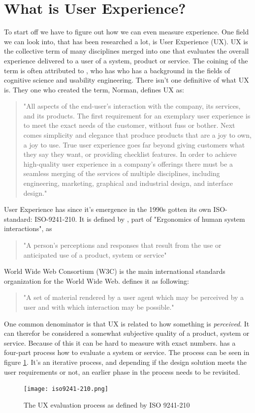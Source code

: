 \documentclass{cslthse-msc}
\begin{document}
    \section{What is User Experience?}
    To start off we have to figure out how we can even measure experience. One field we can look into, that has been researched a lot, is User Experience (UX). UX is the collective term of many disciplines merged into one that evaluates the overall experience delivered to a user of a
    system, product or service. The coining of the term is often attributed to \citet{norman}, who has who has a background in the fields of cognitive science and usability engineering. There isn't one definitive of what UX is. They one who created the term, Norman, defines UX as:
    \begin{quote}
        "All aspects of the end-user’s interaction with the company, its services, and its products. The first requirement for an exemplary user experience is to meet the exact needs of the customer, without fuss or bother. Next comes simplicity and elegance that produce products that are a joy to own, a joy to use. True user experience goes far beyond giving customers what they say they want, or providing checklist features. In order to achieve high-quality user experience in a company’s offerings there must be a seamless merging of the services of multiple disciplines, including engineering, marketing, graphical and industrial design, and interface design."
    \end{quote}
    User Experience has since it's emergence in the 1990s gotten its own ISO-standard: ISO-9241-210. It is defined by \citet{iso9241}, part
    of "Ergonomics of human system interactions", as \begin{quote}
                                                         "A person's perceptions and responses that result from the use or anticipated use of a product, system or service"
    \end{quote}
    World Wide Web Consortium (W3C) is the main international standards organization for the World Wide Web. \citet{w3c} defines it as following:
    \begin{quote}
        "A set of material rendered by a user agent which may be perceived by a user and with which interaction may be possible."
    \end{quote}
    One common denominator is that UX is related to how something is \textit{perceived}. It can therefor be considered a somewhat
    subjective quality of a product, system or service. Because of this it can be hard to measure with exact numbers. \citet{iso9241} has a four-part process how to evaluate a system or service. The process can be seen in figure \ref{fig:iso9241}. It's an iterative process, and depending if the design solution  meets the user requirements or not, an earlier phase in the process needs to be revisited.
    \begin{figure}[H]
        \centering
        \texttt{[image: iso9241-210.png]}
        \caption{The UX evaluation process as defined by ISO 9241-210}
        \label{fig:iso9241}
    \end{figure}
\end{document}
